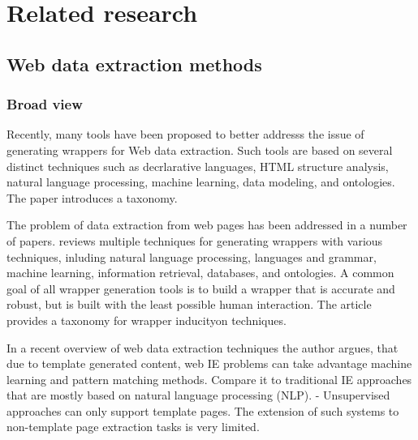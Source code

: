 \chapter{Related research}




\section{Web data extraction methods}


\subsection{Broad view}

\cite{Laender:2002:BSW:565117.565137} Recently, many tools have been proposed to better addresss the issue of generating wrappers for Web data extraction. Such tools are based on several distinct techniques such as decrlarative languages, HTML structure analysis, natural language processing, machine learning, data modeling, and ontologies. The paper introduces a taxonomy.

The problem of data extraction from web pages has been addressed in a number of papers. \cite{Laender:2002:BSW:565117.565137} reviews multiple techniques for generating wrappers with various techniques, inluding natural language processing, languages and grammar, machine learning, information retrieval, databases, and ontologies. A common goal of all wrapper generation tools is to build a wrapper that is accurate and robust, but is built with the least possible human interaction. The article provides a taxonomy for wrapper inducityon techniques.

In a recent overview of web data extraction techniques \cite{Chang:2006:SWI:1159162.1159300} the author argues, that due to template generated content, web IE problems can take advantage machine learning and pattern matching methods. Compare it to traditional IE approaches that are mostly based on natural language processing (NLP).
- Unsupervised approaches can only support template pages. The extension of such systems to non-template page extraction tasks is very limited.

